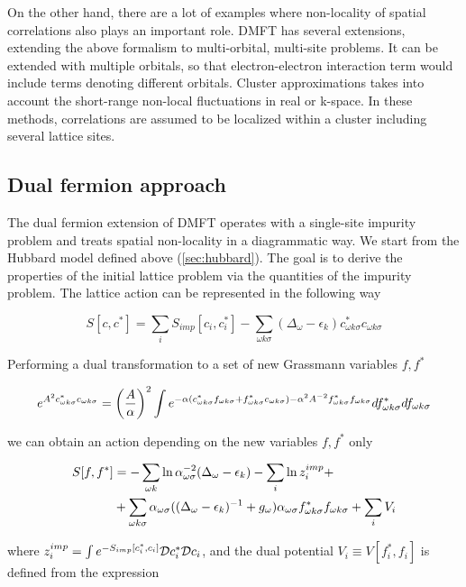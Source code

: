 On the other hand, there are a lot of examples where non-locality of spatial correlations also plays an important role.
DMFT has several extensions, extending the above formalism to multi-orbital, multi-site problems.
It can be extended with multiple orbitals, so that electron-electron interaction term would include terms denoting different orbitals.
Cluster approximations takes into account the short-range non-local fluctuations in real or k-space.
In these methods, correlations are assumed to be localized within a cluster including several lattice sites.

\subsection{Dual fermion approach}
The dual fermion extension \cite{0810.3819} of DMFT operates with a single-site impurity problem and treats spatial non-locality in a diagrammatic way.
We start from the Hubbard model defined above (\autoref{sec:hubbard}).
The goal is to derive the properties of the initial lattice problem via the quantities of the impurity problem.
The lattice action can be represented in the following way

\begin{equation} S[c,c^*] = \sum_i S_{imp}[c_i,c_i^*] - \sum_{\omega k \sigma}(\Delta_\omega-\epsilon_k)c_{\omega k\sigma}^* c_{\omega k\sigma} \end{equation}

Performing a dual transformation to a set of new Grassmann variables $f,f^*$

\begin{equation} e^{A^2 c_{\omega k\sigma}^*c_{\omega k\sigma}} = \left(\frac{A}{\alpha}\right)^2 \int 
    e^{-\alpha(c_{\omega k\sigma}^*f_{\omega k\sigma}+f_{\omega k\sigma}^*c_{\omega k\sigma})-\alpha^2 A^{-2}f_{\omega k\sigma}^*f_{\omega k\sigma}}df_{\omega k\sigma}^*df_{\omega k\sigma}
 \end{equation}

we can obtain an action depending on the new variables $f,f^*$ only

\begin{equation}\begin{aligned}
S[f,f^*] & = -\sum_{\omega k} \ln{\alpha_{\omega\sigma}^{-2}(\Delta_\omega-\epsilon_k)} - \sum_i\ln{z_i^{imp}} + \\ 
	 & + \sum_{\omega k\sigma} \alpha_{\omega\sigma}((\Delta_\omega-\epsilon_k)^{-1}+g_\omega) \alpha_{\omega\sigma}f_{\omega k\sigma}^*f_{\omega k\sigma}+\sum_i V_i 
\end{aligned}\end{equation}

where $z_i^{imp} = \int e^{-S_{imp}[c_i^*,c_i]}\mathcal{D} c_i^*\mathcal{D} c_i$, and the dual potential $V_i \equiv V[f_i^*,f_i]$ is defined from the expression

